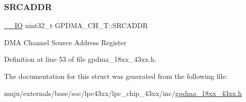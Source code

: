 \subsubsection{\texorpdfstring{S\+R\+C\+A\+D\+DR}{SRCADDR}}
{\footnotesize\ttfamily \hyperlink{core__sc300_8h_aec43007d9998a0a0e01faede4133d6be}{\+\_\+\+\_\+\+IO} uint32\+\_\+t G\+P\+D\+M\+A\+\_\+\+C\+H\+\_\+\+T\+::\+S\+R\+C\+A\+D\+DR}

D\+MA Channel Source Address Register 

Definition at line 53 of file gpdma\+\_\+18xx\+\_\+43xx.\+h.



The documentation for this struct was generated from the following file\+:\begin{DoxyCompactItemize}
\item 
muju/externals/base/soc/lpc43xx/lpc\+\_\+chip\+\_\+43xx/inc/\hyperlink{gpdma__18xx__43xx_8h}{gpdma\+\_\+18xx\+\_\+43xx.\+h}\end{DoxyCompactItemize}
